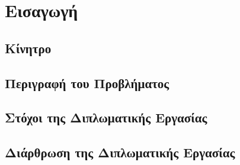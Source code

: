 \chapter{Εισαγωγή}
\section{Κίνητρο}

\section{Περιγραφή του Προβλήματος}

\section{Στόχοι της Διπλωματικής Εργασίας}

\section{Διάρθρωση της Διπλωματικής Εργασίας}